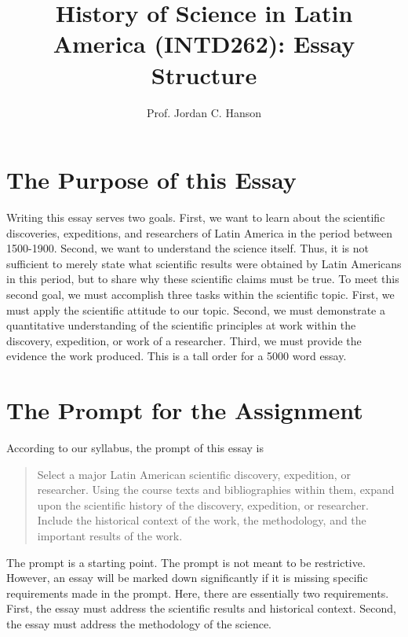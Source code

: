 \documentclass{article}
\begin{document}
\twocolumn

\title{History of Science in Latin America (INTD262): Essay Structure}
\author{Prof. Jordan C. Hanson}

\maketitle

\section{The Purpose of this Essay}

Writing this essay serves two goals.  First, we want to learn about the scientific discoveries, expeditions, and researchers of Latin America in the period between 1500-1900.  Second, we want to understand the science itself.  Thus, it is not sufficient to merely state what scientific results were obtained by Latin Americans in this period, but to share why these scientific claims must be true.  To meet this second goal, we must accomplish three tasks within the scientific topic.  First, we must apply the scientific attitude to our topic.  Second, we must demonstrate a quantitative understanding of the scientific principles at work within the discovery, expedition, or work of a researcher.  Third, we must provide the evidence the work produced.  This is a tall order for a 5000 word essay.

\section{The Prompt for the Assignment}

According to our syllabus, the prompt of this essay is

\begin{quote}
Select a major Latin American scientific discovery, expedition, or researcher. Using the course texts and bibliographies within them, expand upon the scientific history of the discovery, expedition, or researcher. Include the historical context of the work, the methodology, and the important results of the work.
\end{quote}

The prompt is a starting point.  The prompt is not meant to be restrictive.  However, an essay will be marked down significantly if it is missing specific requirements made in the prompt.  Here, there are essentially two requirements.  First, the essay must address the scientific results and historical context.  Second, the essay must address the methodology of the science.
\end{document}
